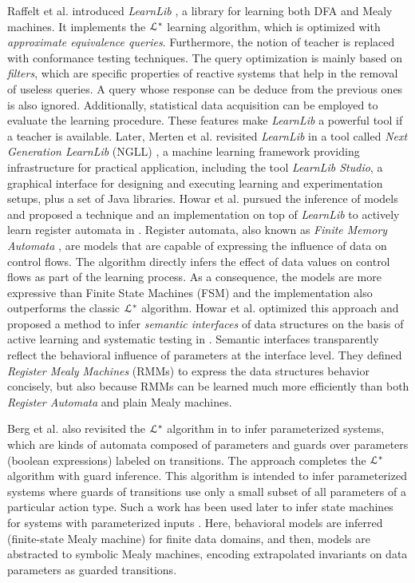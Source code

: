 Raffelt et al. introduced \textit{LearnLib}
\cite{Raffelt:2005:LLA:1081180.1081189}, a library for learning
both DFA and Mealy machines. It implements the $\EuScript{L}^*$
\cite{Angluin198787} learning algorithm, which is optimized with
\textit{approximate equivalence queries}. Furthermore, the
notion of teacher is replaced with conformance testing
techniques. The query optimization is mainly based on
\textit{filters}, which are specific properties of reactive
systems that help in the removal of useless queries. A query
whose response can be deduce from the previous ones is also
ignored. Additionally, statistical data acquisition can be
employed to evaluate the learning procedure. These features make
\textit{LearnLib} a powerful tool if a teacher is available.
Later, Merten et al. revisited \textit{LearnLib} in a tool called
\textit{Next Generation LearnLib} (NGLL) \cite{ngll11}, a machine
learning framework providing infrastructure for practical
application, including the tool \textit{LearnLib Studio}, a
graphical interface for designing and executing learning and
experimentation setups, plus a set of Java libraries. Howar et
al. pursued the inference of models  and proposed a technique and
an implementation on top of \textit{LearnLib} to actively learn
register automata in \cite{howarRA2012}. Register automata, also
known as \textit{Finite Memory Automata} \cite{Kaminski1994329},
are models that are capable of expressing the influence of data
on control flows. The algorithm directly infers the effect of
data values on control flows as part of the learning process. As
a consequence, the models are more expressive than Finite State
Machines (FSM) and the implementation also  outperforms the
classic $\EuScript{L}^*$ algorithm. Howar et al. optimized this
approach and proposed a method to infer \textit{semantic
interfaces} of data structures on the basis of active learning
and systematic testing in \cite{howar2012}. Semantic interfaces
transparently reflect the behavioral influence of parameters at
the interface level.  They defined \textit{Register Mealy
Machines} (RMMs) to express the data structures behavior
concisely, but also because RMMs can be learned much more
efficiently than both \textit{Register Automata} and plain Mealy
machines.

Berg et al. also revisited the $\EuScript{L}^*$ algorithm in
\cite{regularinfBerg06} to infer parameterized systems, which are
kinds of automata composed of parameters and guards over
parameters (boolean expressions) labeled on transitions. The
approach completes the  $\EuScript{L}^*$ algorithm with guard
inference. This algorithm is intended to infer parameterized
systems where guards of transitions use only a small subset of
all parameters of a particular action type. Such a work has been
used later to infer state machines for systems with parameterized
inputs \cite{regularinfBerg08}. Here, behavioral models are
inferred (finite-state Mealy machine) for finite data domains,
and then, models are abstracted to symbolic Mealy machines,
encoding extrapolated invariants on data parameters as guarded
transitions.

